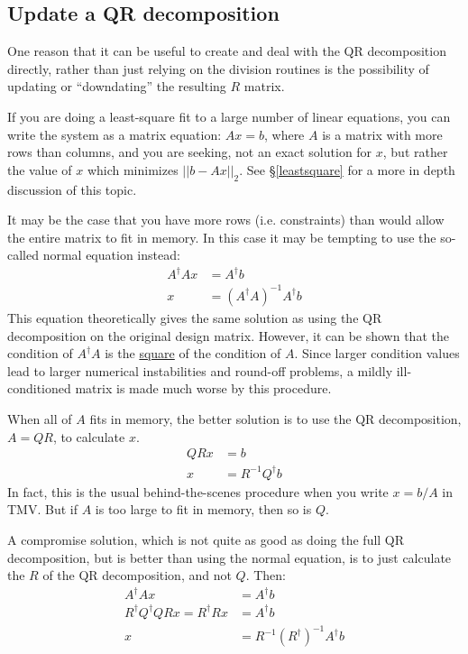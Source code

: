 \documentclass[twoside,letterpaper,11pt]{article}
\begin{document}
\subsection{Update a QR decomposition}

One reason that it can be useful to create and deal with the QR decomposition directly,
rather than 
just relying on the division routines is the possibility
of updating or ``downdating'' the resulting $R$ matrix.  

If you are doing a 
least-square fit to a large number of linear equations, you can write the system as
a matrix equation: 
$A x = b$, where $A$ is a matrix with more rows than columns, and you are seeking,
not an exact solution for $x$, but rather the value of $x$ which minimizes
$||b-Ax||_2$.  See \S\ref{leastsquare} for a more in depth discussion of this topic.

It may be the case that you
have more rows (i.e. constraints) than would allow the entire matrix to fit in memory.  
In this case it may be tempting to use the so-called normal equation instead: 
\begin{align*}
A^\dagger A x &= A^\dagger b \\
x & = (A^\dagger A)^{-1} A^\dagger b
\end{align*}
This equation theoretically gives the same 
solution as using the QR decomposition on the original design matrix.
However, it can be shown that the condition of $A^\dagger A$ is the 
\underline{square} of the condition of $A$.  Since larger condition values
lead to larger numerical instabilities and round-off problems, a mildly
ill-conditioned matrix is made much worse by this procedure.

When all of $A$ fits in memory, the better solution is to use the QR decomposition, $A = QR$,
to calculate $x$.
\begin{align*}
Q R x &= b \\
x &= R^{-1} Q^\dagger b
\end{align*}
In fact, this is the usual behind-the-scenes procedure when you write $x = b/A$ in TMV.
But if $A$ is too large to fit in memory, then so is $Q$.

A compromise solution, which is not quite as good as doing the full QR decomposition,
but is better than using the normal equation, is to just calculate the $R$ of the
QR decomposition, and not $Q$.  Then:
\begin{align*}
A^\dagger A x &= A^\dagger b \\
R^\dagger Q^\dagger Q R x = R^\dagger R x &= A^\dagger b \\
x &= R^{-1} (R^\dagger)^{-1} A^\dagger b
\end{align*}
\end{document}

